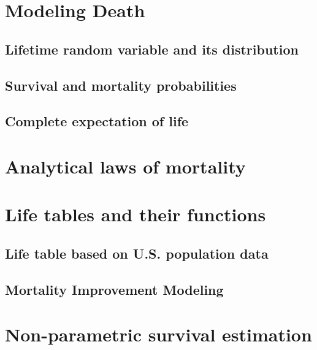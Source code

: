 \documentclass[
]{book}
\begin{document}
\hypertarget{Sec:ModelingDeaths}{%
\section{Modeling Death}\label{Sec:ModelingDeaths}}

\hypertarget{lifetime-random-variable-and-its-distribution}{%
\subsection{Lifetime random variable and its distribution}\label{lifetime-random-variable-and-its-distribution}}

\hypertarget{survival-and-mortality-probabilities}{%
\subsection{Survival and mortality probabilities}\label{survival-and-mortality-probabilities}}

\hypertarget{S:LifeExp}{%
\subsection{Complete expectation of life}\label{S:LifeExp}}

\hypertarget{S:AnalMortLaws}{%
\section{Analytical laws of mortality}\label{S:AnalMortLaws}}

\hypertarget{S:LifeTab}{%
\section{Life tables and their functions}\label{S:LifeTab}}

\hypertarget{S:LifeTabBasic}{%
\subsection{Life table based on U.S. population data}\label{S:LifeTabBasic}}

\hypertarget{S:LifeTabMImpr}{%
\subsection{Mortality Improvement Modeling}\label{S:LifeTabMImpr}}

\hypertarget{S:NonParamSurv}{%
\section{Non-parametric survival estimation}\label{S:NonParamSurv}}
\end{document}
